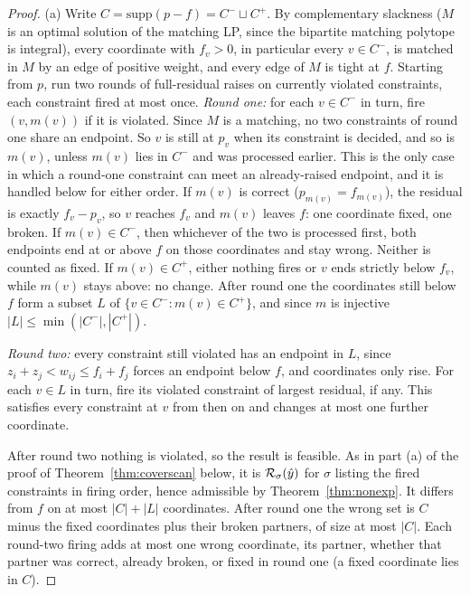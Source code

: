 \begin{proof}
(a) Write $C = \mathrm{supp}(p - f) = C^- \sqcup C^+$. By complementary slackness ($M$ is an optimal solution of the matching LP, since the bipartite matching polytope is integral), every coordinate with $f_v > 0$, in particular every $v \in C^-$, is matched in $M$ by an edge of positive weight, and every edge of $M$ is tight at $f$. Starting from $p$, run two rounds of full-residual raises on currently violated constraints, each constraint fired at most once.
\emph{Round one:} for each $v \in C^-$ in turn, fire $(v, m(v))$ if it is violated. Since $M$ is a
matching, no two constraints of round one share an endpoint. So $v$ is still at $p_v$ when its
constraint is decided, and so is $m(v)$, unless $m(v)$ lies in $C^-$ and was processed earlier.
This is the only case in which a round-one constraint can meet an already-raised endpoint, and
it is handled below for either order. If $m(v)$ is correct ($p_{m(v)} = f_{m(v)}$), the residual
is exactly $f_v - p_v$, so $v$ reaches $f_v$ and $m(v)$ leaves $f$: one coordinate fixed, one
broken. If $m(v) \in C^-$, then whichever of the two is processed first, both endpoints end at or
above $f$ on those coordinates and stay wrong. Neither is counted as fixed. If $m(v) \in C^+$,
either nothing fires or $v$ ends strictly below $f_v$, while $m(v)$ stays above: no change. After
round one the coordinates still below $f$ form a subset $L$ of
$\{ v \in C^- : m(v) \in C^+ \}$, and since $m$ is injective $|L| \le \min(|C^-|, |C^+|)$.

\emph{Round two:} every constraint still violated has an endpoint in $L$, since
$z_i + z_j < w_{ij} \le f_i + f_j$ forces an endpoint below $f$, and coordinates only rise. For each $v \in L$ in turn, fire its violated constraint of largest residual, if any. This satisfies every constraint at $v$ from then on and changes at most one further coordinate.

After round two nothing is violated, so the result is feasible. As in part (a) of the proof of Theorem~\ref{thm:coverscan} below, it is $\mathcal{R}_\sigma(\hat y)$ for $\sigma$ listing the fired constraints in firing order, hence admissible by Theorem~\ref{thm:nonexp}. It differs from $f$ on at most $|C| + |L|$ coordinates. After round one the wrong set is $C$ minus the fixed coordinates plus their broken partners, of size at most $|C|$. Each round-two firing adds at most one wrong coordinate, its partner, whether that partner was correct, already broken, or fixed in round one (a fixed coordinate lies in $C$).


\end{proof}
